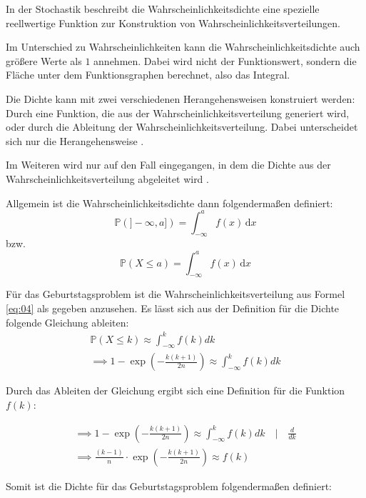 \documentclass[../main.tex]{subfiles}
\begin{document}
\begin{flushleft}
In der Stochastik beschreibt die Wahrscheinlichkeitsdichte eine spezielle reellwertige Funktion zur Konstruktion von Wahrscheinlichkeitsverteilungen.

Im Unterschied zu Wahrscheinlichkeiten kann die Wahrscheinlichkeitsdichte auch größere Werte als $1$ annehmen. Dabei wird nicht der Funktionswert, sondern die Fläche unter dem Funktionsgraphen berechnet, also das Integral.

Die Dichte kann mit zwei verschiedenen Herangehensweisen konstruiert werden: Durch eine Funktion, die aus der Wahrscheinlichkeitsverteilung generiert wird, oder durch die Ableitung der Wahrscheinlichkeitsverteilung. Dabei unterscheidet sich nur die Herangehensweise  \cite[560ff]{henze}.

Im Weiteren wird nur auf den Fall eingegangen, in dem die Dichte aus der Wahrscheinlichkeitsverteilung abgeleitet wird  \cite[22ff]{georgii}. \newline

Allgemein ist die Wahrscheinlichkeitsdichte dann folgendermaßen definiert:
\begin{equation}
\mathbb{P}(]-\infty, a])= \int_{-\infty}^a f(x) \, \mathrm d x
\end{equation}
bzw.
\begin{equation}
\mathbb{P}(X \leq a)= \int_{-\infty}^a f(x) \,\mathrm d x
\end{equation}

Für das Geburtstagsproblem ist die Wahrscheinlichkeitsverteilung aus Formel \ref{eq:04} als gegeben anzusehen. Es lässt sich aus der Definition für die Dichte folgende Gleichung ableiten:
\begin{eqnarray}
\mathbb{P}(X \leq k) \approx \int_{ -\infty }^{ k }{ f(k) dk } \\
\implies 1 - \exp( - \frac{ k (k + 1) }{ 2n } ) \approx \int_{ -\infty }^{ k }{ f(k) dk }
\end{eqnarray}


Durch das Ableiten der Gleichung ergibt sich eine Definition für die Funktion $f(k)$:

\begin{eqnarray}
\implies 1 - \exp( - \frac{ k (k + 1) }{ 2n } ) \approx \int_{ -\infty }^{ k }{ f(k) dk } \quad | \quad \frac{ d }{ dk }\\
\implies \frac{ (k-1) }{ n } \cdot \exp( - \frac{ k (k + 1) }{ 2n } ) \approx f(k)
\end{eqnarray}

Somit ist die Dichte für das Geburtstagsproblem folgendermaßen definiert:


\end{flushleft}
\end{document}
